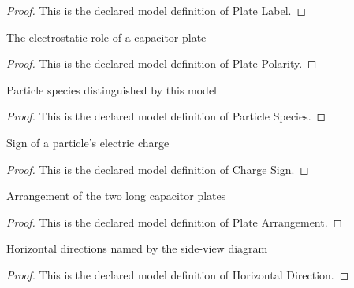 \begin{proof}
  This is the declared model definition of Plate Label.
\end{proof}
\begin{definition}
  \label{def:physics:phyx-mini-0866:phyxminiproblems-problemphyxmini0866-platepolarity}
  The electrostatic role of a capacitor plate
\end{definition}
\begin{proof}
  This is the declared model definition of Plate Polarity.
\end{proof}
\begin{definition}
  \label{def:physics:phyx-mini-0866:phyxminiproblems-problemphyxmini0866-particlespecies}
  Particle species distinguished by this model
\end{definition}
\begin{proof}
  This is the declared model definition of Particle Species.
\end{proof}
\begin{definition}
  \label{def:physics:phyx-mini-0866:phyxminiproblems-problemphyxmini0866-chargesign}
  Sign of a particle's electric charge
\end{definition}
\begin{proof}
  This is the declared model definition of Charge Sign.
\end{proof}
\begin{definition}
  \label{def:physics:phyx-mini-0866:phyxminiproblems-problemphyxmini0866-platearrangement}
  Arrangement of the two long capacitor plates
\end{definition}
\begin{proof}
  This is the declared model definition of Plate Arrangement.
\end{proof}
\begin{definition}
  \label{def:physics:phyx-mini-0866:phyxminiproblems-problemphyxmini0866-horizontaldirection}
  Horizontal directions named by the side-view diagram
\end{definition}
\begin{proof}
  This is the declared model definition of Horizontal Direction.
\end{proof}

